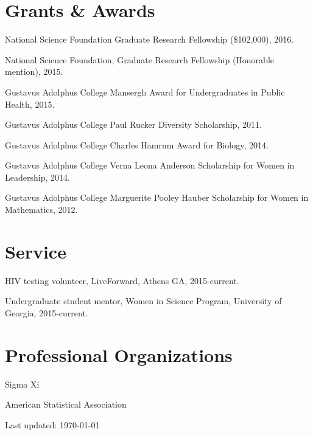 \documentclass[letterpaper]{article}
\def\footerlink{}
\renewenvironment{itemize}{
  \begin{list}{}{
    \setlength{\leftmargin}{1.5em}
  }
}{
  \end{list}
}
\begin{document}
\section*{Grants \& Awards}

\begin{itemize}
\item National Science Foundation Graduate Research Fellowship (\$102,000), 2016. 
\item National Science Foundation, Graduate Research Fellowship (Honorable mention), 2015.
\item Gustavus Adolphus College Mansergh Award for Undergraduates in Public Health, 2015.
\item Gustavus Adolphus College Paul Rucker Diversity Scholarship, 2011.
\item Gustavus Adolphus College Charles Hamrum Award for Biology, 2014.
\item Gustavus Adolphus College Verna Leona Anderson Scholarship for Women in Leadership, 2014. 
\item Gustavus Adolphus College Marguerite Pooley Hauber Scholarship for Women in Mathematics, 2012. 
\end{itemize}

\section*{Service}
\begin{itemize}
\item HIV testing volunteer, LiveForward, Athens GA, 2015-current. 
\item Undergraduate student mentor, Women in Science Program, University of Georgia, 2015-current. 
\end{itemize}

\section*{Professional Organizations}
\begin{itemize}
\item Sigma Xi
\item American Statistical Association
\end{itemize}

\bigskip

\begin{center}
  \begin{footnotesize}
    Last updated: \today \\
    \href{\footerlink}{\texttt{\footerlink}}
  \end{footnotesize}
\end{center}
\end{document}
